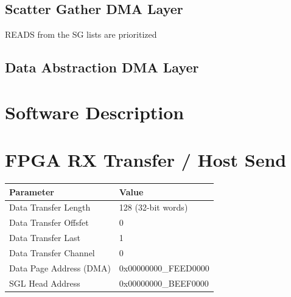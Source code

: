 \documentclass{refrep}
\begin{document}
\subsection{Scatter Gather DMA Layer}
\label{Sec:Developer:Arch:SGDMA}
READS from the SG lists are prioritized
\subsection{Data Abstraction DMA Layer}
\label{Sec:Developer:Arch:DataAbstraction}
\section{Software Description}

\section{FPGA RX Transfer / Host Send}
\begin{center}
  \begin{tabular}{ | l | l |}
    \hline
    Parameter & Value \\ \hline
    Data Transfer Length & 128 (32-bit words)\\ \hline
    Data Transfer Offsfet & 0\\ \hline
    Data Transfer Last & 1\\ \hline
    Data Transfer Channel & 0\\ \hline
    Data Page Address (DMA) & 0x00000000\_FEED0000\\ \hline
    SGL Head Address & 0x00000000\_BEEF0000\\ \hline
  \end{tabular}
\end{center}
\end{document}
